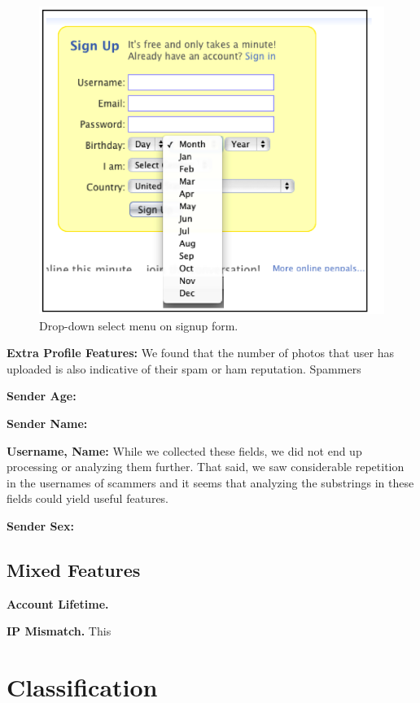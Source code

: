 \documentclass[preprint]{acm_proc_article-sp}
\begin{document}
\begin{figure}[h]
    \centering
    \includegraphics[width=\linewidth]{figures/dropdown.png}
    \caption{Drop-down select menu on signup form.}
    \label{fig:drop}
\end{figure}



\textbf{Extra Profile Features:} We found that the number of photos that user has uploaded is also indicative of their spam or ham reputation. Spammers 

\textbf{Sender Age:}

\textbf{Sender Name:}


\textbf{Username, Name:} While we collected these fields, we did not end up processing or analyzing them further. That said, we saw considerable repetition in the usernames of scammers and it seems that analyzing the substrings in these fields could yield useful features.

\textbf{Sender Sex:}

\subsection{Mixed Features}

\textbf{Account Lifetime.}

\textbf{IP Mismatch.} This 


\section{Classification}
\end{document}
